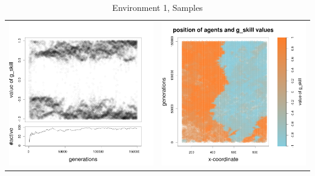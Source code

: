 \documentclass[a4paper,10pt]{article}
\begin{document}
\begin{table}[H]
\caption{Environment 1, Samples}
\centering
\begin{tabular}{cc}
\includegraphics[width=\imgSize]{../images/5StaticEnv/Gplot47_staticEnv1}&\includegraphics[width=\imgSize]{../images/5StaticEnv/Gplot47Static_staticEnv1}\\

\end{tabular}
\end{table}
\end{document}
